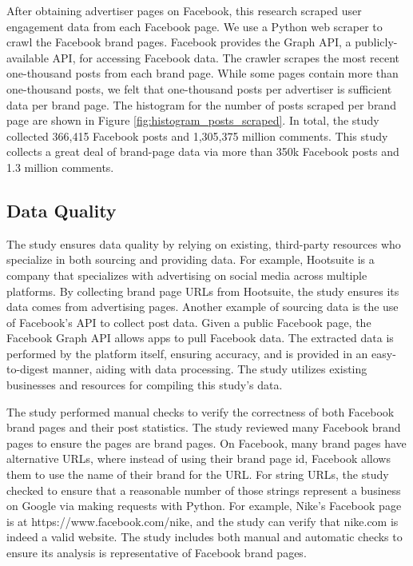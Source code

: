 \documentclass[mksc,blindrev]{informs3} %
\begin{document}
After obtaining advertiser pages on Facebook, this research scraped user engagement data from each Facebook page. We use a Python web scraper to crawl the Facebook brand pages. Facebook provides the Graph API, a publicly-available API, for accessing Facebook data. The crawler scrapes the most recent one-thousand posts from each brand page. While some pages contain more than one-thousand posts, we felt that one-thousand posts per advertiser is sufficient data per brand page. The histogram for the number of posts scraped per brand page are shown in Figure \ref{fig:histogram_posts_scraped}. In total, the study collected 366,415 Facebook posts and 1,305,375 million comments. This study collects a great deal of brand-page data via more than 350k Facebook posts and 1.3 million comments.

\subsection{Data Quality}

The study ensures data quality by relying on existing, third-party resources who specialize in both sourcing and providing data. For example, Hootsuite is a company that specializes with advertising on social media across multiple platforms. By collecting brand page URLs from Hootsuite, the study ensures its data comes from advertising pages. Another example of sourcing data is the use of Facebook's API to collect post data. Given a public Facebook page, the Facebook Graph API allows apps to pull Facebook data. The extracted data is performed by the platform itself, ensuring accuracy, and is provided in an easy-to-digest manner, aiding with data processing. The study utilizes existing businesses and resources for compiling this study's data.

The study performed manual checks to verify the correctness of both Facebook brand pages and their post statistics. The study reviewed many Facebook brand pages to ensure the pages are brand pages. On Facebook, many brand pages have alternative URLs, where instead of using their brand page id, Facebook allows them to use the name of their brand for the URL. For string URLs, the study checked to ensure that a reasonable number of those strings represent a business on Google via making requests with Python. For example, Nike's Facebook page is at https://www.facebook.com/nike, and the study can verify that nike.com is indeed a valid website. The study includes both manual and automatic checks to ensure its analysis is representative of Facebook brand pages.
\end{document}
